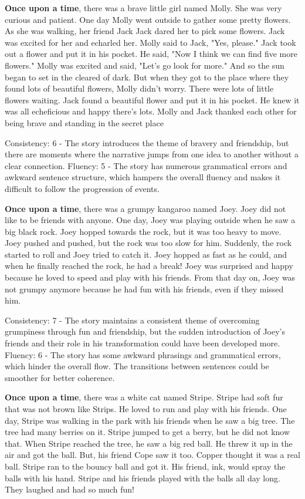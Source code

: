 \documentclass{article}
\begin{document}
\textbf{Once upon a time}, there was a brave little girl named Molly. She was very curious and patient. One day Molly went outside to gather some pretty flowers. As she was walking, her friend Jack Jack dared her to pick some flowers. Jack was excited for her and echarled her. Molly said to Jack, "Yes, please." Jack took out a flower and put it in his pocket. He said, "Now I think we can find five more flowers." Molly was excited and said, "Let's go look for more." And so the sun began to set in the cleared of dark. But when they got to the place where they found lots of beautiful flowers, Molly didn't worry. There were lots of little flowers waiting. Jack found a beautiful flower and put it in his pocket. He knew it was all echeficious and happy there's lots. Molly and Jack thanked each other for being brave and standing in the secret place

Consistency: 6 - The story introduces the theme of bravery and friendship, but there are moments where the narrative jumps from one idea to another without a clear connection.
Fluency: 5 - The story has numerous grammatical errors and awkward sentence structure, which hampers the overall fluency and makes it difficult to follow the progression of events.

\textbf{Once upon a time}, there was a grumpy kangaroo named Joey. Joey did not like to be friends with anyone. One day, Joey was playing outside when he saw a big black rock. Joey hopped towards the rock, but it was too heavy to move. Joey pushed and pushed, but the rock was too slow for him. Suddenly, the rock started to roll and Joey tried to catch it. Joey hopped as fast as he could, and when he finally reached the rock, he had a break! Joey was surprised and happy because he loved to speed and play with his friends. From that day on, Joey was not grumpy anymore because he had fun with his friends, even if they missed him.

Consistency: 7 - The story maintains a consistent theme of overcoming grumpiness through fun and friendship, but the sudden introduction of Joey's friends and their role in his transformation could have been developed more.
Fluency: 6 - The story has some awkward phrasings and grammatical errors, which hinder the overall flow. The transitions between sentences could be smoother for better coherence.

\textbf{Once upon a time}, there was a white cat named Stripe. Stripe had soft fur that was not brown like Strips. He loved to run and play with his friends. One day, Stripe was walking in the park with his friends when he saw a big tree. The tree had many berries on it. Stripe jumped to get a berry, but he did not know that. When Stripe reached the tree, he saw a big red ball. He threw it up in the air and got the ball. But, his friend Cope saw it too. Copper thought it was a real ball. Stripe ran to the bouncy ball and got it. His friend, ink, would spray the balls with his hand. Stripe and his friends played with the balls all day long. They laughed and had so much fun!
\end{document}
